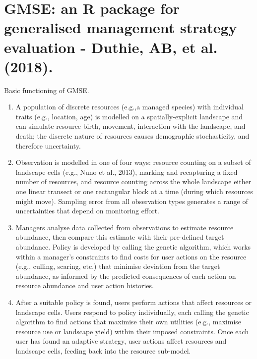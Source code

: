 \documentclass[12pt]{article}
\begin{document}
\section{GMSE:  an  R  package  for generalised  management  strategy  evaluation - Duthie,  AB,  et al.  (2018).}
Basic functioning of GMSE.
\begin{enumerate}
                \item A population of discrete resources (e.g.,a managed species) with individual traits (e.g., location, age) is modelled on a spatially-explicit landscape and can simulate resource birth, movement, interaction with the landscape, and death; the discrete nature of resources causes demographic stochasticity, and therefore uncertainty. %
                \item Observation is modelled in one of four ways: resource counting on a subset of landscape cells (e.g., Nuno et al., 2013), marking and recapturing a fixed number of resources, and resource counting across the whole landscape either one linear transect or one rectangular block at a time (during which resources might move). Sampling error from all observation types generates a range of uncertainties that depend on monitoring effort.
                \item Managers analyse data collected from observations to estimate resource abundance, then compare this estimate with their pre-defined target abundance. Policy is developed by calling the genetic algorithm, which works within a manager’s constraints to find costs for user actions on the resource (e.g., culling, scaring, etc.) that minimise deviation from the target abundance, as informed by the predicted consequences of each action on resource abundance and user action histories.
                \item After a suitable policy is found, users perform actions that affect resources or landscape cells. Users respond to policy individually, each calling the genetic algorithm to find actions that maximise their own utilities (e.g., maximise resource use or landscape yield) within their imposed constraints. Once each user has found an adaptive strategy, user actions affect resources and landscape cells, feeding back into the resource sub-model.
\end{enumerate}
\end{document}
